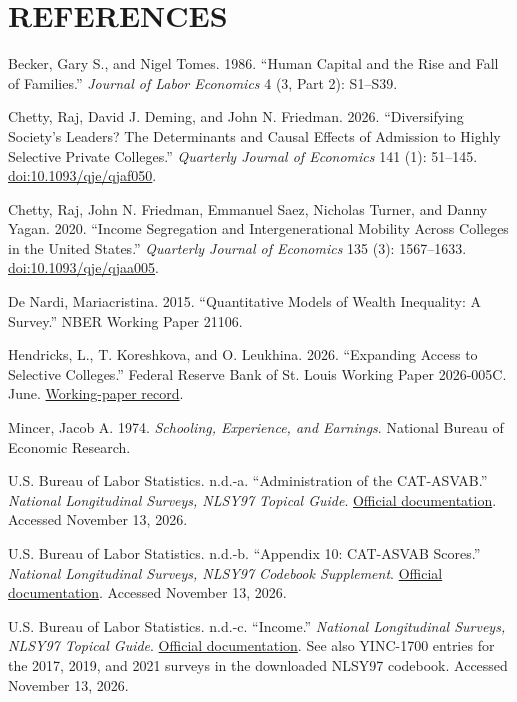 \documentclass[12pt,letterpaper]{article}
\begin{document}
\section*{REFERENCES}
\begin{list}{}{\setlength{\leftmargin}{0.3in}
              \setlength{\itemindent}{-0.3in}
              \setlength{\itemsep}{0.6\baselineskip}
              \setlength{\parsep}{0pt}}
\item Becker, Gary S., and Nigel Tomes. 1986. ``Human Capital and the Rise and Fall of Families.'' \textit{Journal of Labor Economics} 4 (3, Part 2): S1--S39.
\item Chetty, Raj, David J. Deming, and John N. Friedman. 2026. ``Diversifying Society's Leaders? The Determinants and Causal Effects of Admission to Highly Selective Private Colleges.'' \textit{Quarterly Journal of Economics} 141 (1): 51--145. \href{https://doi.org/10.1093/qje/qjaf050}{doi:10.1093/qje/qjaf050}.
\item Chetty, Raj, John N. Friedman, Emmanuel Saez, Nicholas Turner, and Danny Yagan. 2020. ``Income Segregation and Intergenerational Mobility Across Colleges in the United States.'' \textit{Quarterly Journal of Economics} 135 (3): 1567--1633. \href{https://doi.org/10.1093/qje/qjaa005}{doi:10.1093/qje/qjaa005}.
\item De Nardi, Mariacristina. 2015. ``Quantitative Models of Wealth Inequality: A Survey.'' NBER Working Paper 21106.
\item Hendricks, L., T. Koreshkova, and O. Leukhina. 2026. ``Expanding Access to Selective Colleges.'' Federal Reserve Bank of St. Louis Working Paper 2026-005C. June. \href{https://fedinprint.org/item/fedlwp/102965/103306}{Working-paper record}.
\item Mincer, Jacob A. 1974. \textit{Schooling, Experience, and Earnings}. National Bureau of Economic Research.
\item U.S. Bureau of Labor Statistics. n.d.-a. ``Administration of the CAT-ASVAB.'' \textit{National Longitudinal Surveys, NLSY97 Topical Guide}. \href{https://nlsinfo.org/content/cohorts/nlsy97/topical-guide/education/administration-cat-asvab-0}{Official documentation}. Accessed November 13, 2026.
\item U.S. Bureau of Labor Statistics. n.d.-b. ``Appendix 10: CAT-ASVAB Scores.'' \textit{National Longitudinal Surveys, NLSY97 Codebook Supplement}. \href{https://nlsinfo.org/content/cohorts/nlsy97/other-documentation/codebook-supplement/appendix-10-cat-asvab-scores}{Official documentation}. Accessed November 13, 2026.
\item U.S. Bureau of Labor Statistics. n.d.-c. ``Income.'' \textit{National Longitudinal Surveys, NLSY97 Topical Guide}. \href{https://nlsinfo.org/content/cohorts/nlsy97/topical-guide/income/income}{Official documentation}. See also YINC-1700 entries for the 2017, 2019, and 2021 surveys in the downloaded NLSY97 codebook. Accessed November 13, 2026.
\end{list}
\end{document}
